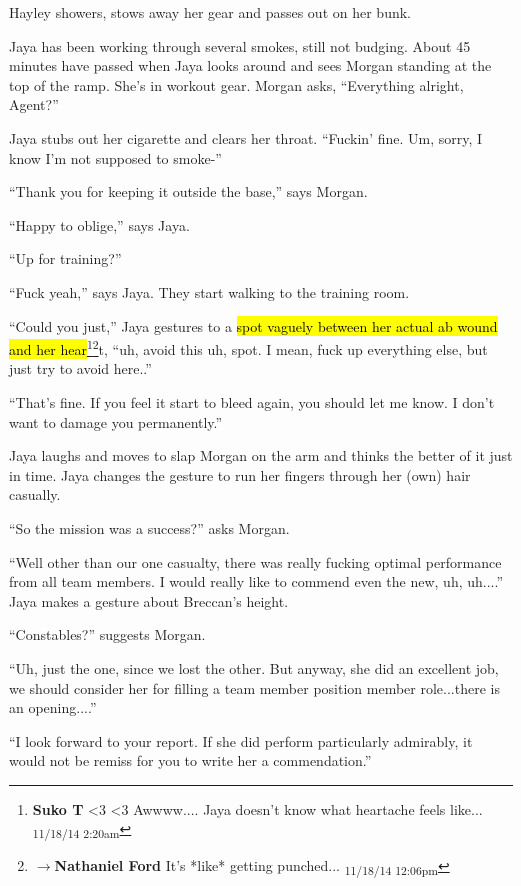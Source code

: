 Hayley showers, stows away her gear and passes out on her bunk.





Jaya has been working through several smokes, still not budging.  About 45 minutes have passed when Jaya looks around and sees Morgan standing at the top of the ramp.  She's in workout gear.   Morgan asks, ``Everything alright, Agent?'' 

Jaya stubs out her cigarette and clears her throat. ``Fuckin' fine.  Um, sorry, I know I'm not supposed to smoke-''

``Thank you for keeping it outside the base,'' says Morgan.

``Happy to oblige,'' says Jaya.

``Up for training?''

``Fuck yeah,'' says Jaya.  They start walking to the training room.  

``Could you just,'' Jaya gestures to a \hl{spot vaguely between her actual ab wound and her hear}\footnote{\textbf{Suko T }\textless 3 \textless 3  Awwww.... Jaya doesn't know what heartache feels like... \textsubscript{11/18/14 2:20am}}\footnote{$\rightarrow$\textbf{Nathaniel Ford }It's *like* getting punched... \textsubscript{11/18/14 12:06pm}}t, ``uh, avoid this uh, spot.  I mean, fuck up everything else, but just try to avoid here..''

``That's fine.  If you feel it start to bleed again, you should let me know.  I don't want to damage you permanently.''

Jaya laughs and moves to slap Morgan on the arm and thinks the better of it just in time.  Jaya changes the gesture to run her fingers through her (own) hair casually.

``So the mission was a success?'' asks Morgan.

``Well other than our one casualty, there was really fucking optimal performance from all team members.  I would really like to commend even the new, uh, uh....'' Jaya makes a gesture about Breccan's height.  

``Constables?'' suggests Morgan.

``Uh, just the one, since we lost the other.  But anyway, she did an excellent job, we should consider her for filling a team member position member role...there is an opening....''

``I look forward to your report.  If she did perform particularly admirably, it would not be remiss for you to write her a commendation.''

